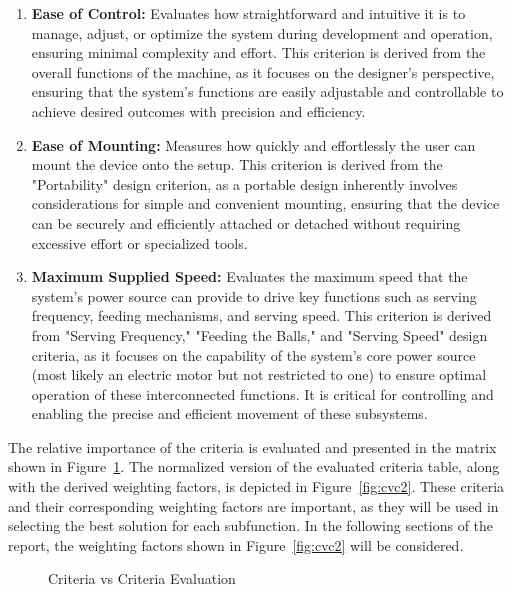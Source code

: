 \documentclass[12pt]{report}
\begin{document}
\begin{enumerate}
    \item \textbf{Ease of Control:} Evaluates how straightforward and intuitive it is to manage, adjust, or optimize the system during development and operation, ensuring minimal complexity and effort. This criterion is derived from the overall functions of the machine, as it focuses on the designer's perspective, ensuring that the system’s functions are easily adjustable and controllable to achieve desired outcomes with precision and efficiency.

    \item \textbf{Ease of Mounting:} Measures how quickly and effortlessly the user can mount the device onto the setup. This criterion is derived from the "Portability" design criterion, as a portable design inherently involves considerations for simple and convenient mounting, ensuring that the device can be securely and efficiently attached or detached without requiring excessive effort or specialized tools.


    \item \textbf{Maximum Supplied Speed:} Evaluates the maximum speed that the system’s power source can provide to drive key functions such as serving frequency, feeding mechanisms, and serving speed. This criterion is derived from "Serving Frequency," "Feeding the Balls," and "Serving Speed" design criteria, as it focuses on the capability of the system’s core power source (most likely an electric motor but not restricted to one) to ensure optimal operation of these interconnected functions. It is critical for controlling and enabling the precise and efficient movement of these subsystems.

    
\end{enumerate}

The relative importance of the criteria is evaluated and presented in the matrix shown in Figure~\ref{fig:cvc1}. The normalized version of the evaluated criteria table, along with the derived weighting factors, is depicted in Figure~\ref{fig:cvc2}. These criteria and their corresponding weighting factors are important, as they will be used in selecting the best solution for each subfunction. In the following sections of the report, the weighting factors shown in Figure~\ref{fig:cvc2} will be considered.


\begin{figure}[H]
    \centering
    \caption{Criteria vs Criteria Evaluation}
    \label{fig:cvc1}
\end{figure}
\end{document}
